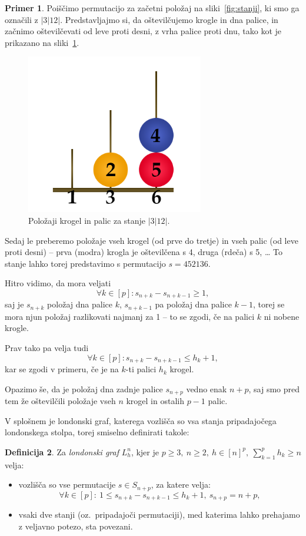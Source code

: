 \documentclass[12pt,a4paper]{amsart}
\theoremstyle{definition} %
\newtheorem{definicija}{Definicija}[section]
\newtheorem{primer}[definicija]{Primer}
\theoremstyle{plain} %
\begin{document}
\begin{primer}
    Poiščimo permutacijo za začetni položaj na sliki~\ref{fig:stanji}, ki smo ga označili z $|3|12|$. 
    Predstavljajmo si, da oštevilčujemo krogle in dna palice, in začnimo oštevilčevati od leve proti desni, z vrha palice proti dnu, tako kot je prikazano na sliki~\ref{fig:ostev-stanji}.
    
    \begin{figure}[h]
        \includegraphics[width=220pt]{img/london-tower-numbered.png}
        \caption{Položaji krogel in palic za stanje $|3|12|$.}
        \label{fig:ostev-stanji}
    \end{figure}
    
    Sedaj le preberemo položaje vseh krogel (od prve do tretje) in vseh palic (od leve proti desni) -- prva (modra) krogla je oštevilčena s 4, druga (rdeča) s 5, \ldots
    To stanje lahko torej predstavimo s permutacijo $s=452136$.
\end{primer}

Hitro vidimo, da mora veljati 
\[\forall k \in [p]\colon s_{n+k} - s_{n+k-1} \geq 1, \]
saj je $s_{n+k}$ položaj dna palice $k$, $s_{n+k-1}$ pa položaj dna palice $k-1$, torej se mora njun položaj razlikovati najmanj za 1 -- to se zgodi, če na palici $k$ ni nobene krogle.

Prav tako pa velja tudi 
\[\forall k \in [p]\colon s_{n+k} - s_{n+k-1} \leq h_k + 1,\]
kar se zgodi v primeru, če je na $k$-ti palici $h_k$ krogel.

Opazimo še, da je položaj dna zadnje palice $s_{n+p}$ vedno enak $n+p$, saj smo pred tem že oštevilčili položaje vseh $n$ krogel in ostalih $p-1$ palic.

V splošnem je londonski graf, katerega vozlišča so vsa stanja pripadajočega londonskega stolpa, torej smiselno definirati takole:

\begin{definicija}
    Za \emph{londonski graf} $L_h^n$, kjer je $p \geq 3,\ n \geq 2,\ h \in [n]^p,\  \sum_{k=1}^p h_k \geq n$ velja:
    \begin{itemize}
        \item vozlišča so vse permutacije $s \in S_{n+p}$, za katere velja:
        \[\forall k \in [p]:\ 1 \leq s_{n+k} - s_{n+k-1} \leq h_k + 1,\ s_{n+p} = n + p ,\]
        \item vsaki dve stanji (oz.\ pripadajoči permutaciji), med katerima lahko prehajamo z veljavno potezo, sta povezani.
    \end{itemize}
\end{definicija}
\end{document}
